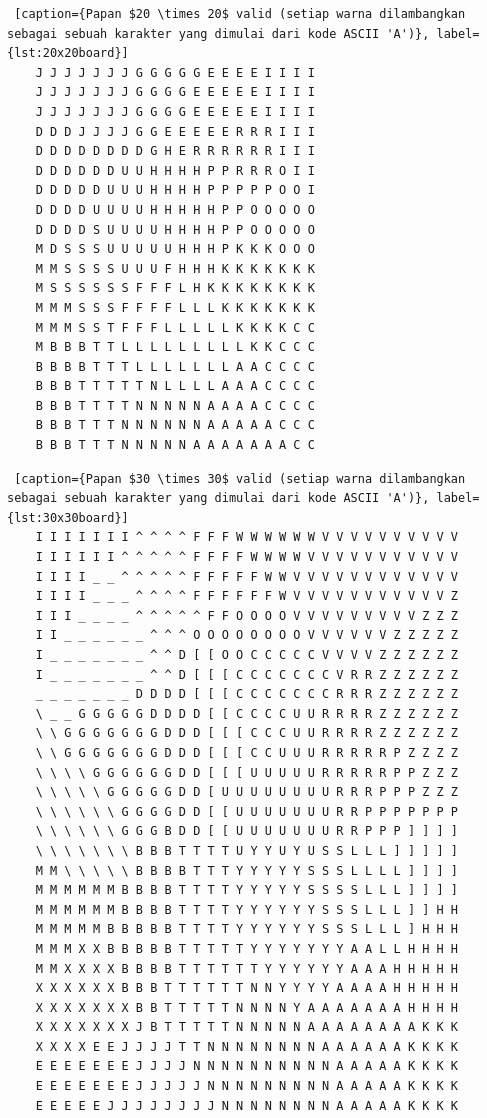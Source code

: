 \documentclass[a4paper,twoside]{article}
\begin{document}
	\begin{lstlisting} [caption={Papan $20 \times 20$ valid (setiap warna dilambangkan sebagai sebuah karakter yang dimulai dari kode ASCII 'A')}, label={lst:20x20board}] 
	J J J J J J J G G G G G E E E E I I I I
	J J J J J J J G G G G E E E E E I I I I
	J J J J J J J G G G G E E E E E I I I I
	D D D J J J J G G E E E E E R R R I I I
	D D D D D D D D G H E R R R R R R I I I
	D D D D D D U U H H H H P P R R R O I I
	D D D D D U U U H H H H P P P P P O O I
	D D D D U U U U H H H H H P P O O O O O
	D D D D S U U U U H H H H P P O O O O O
	M D S S S U U U U U H H H P K K K O O O
	M M S S S S U U U F H H H K K K K K K K
	M S S S S S S F F F L H K K K K K K K K
	M M M S S S F F F F L L L K K K K K K K
	M M M S S T F F F L L L L L K K K K C C
	M B B B T T L L L L L L L L L K K C C C
	B B B B T T T L L L L L L L A A C C C C
	B B B T T T T T N L L L L A A A C C C C
	B B B T T T T N N N N N A A A A C C C C
	B B B T T T N N N N N N A A A A A C C C
	B B B T T T N N N N N A A A A A A A C C
	\end{lstlisting}
	
	\begin{lstlisting} [caption={Papan $30 \times 30$ valid (setiap warna dilambangkan sebagai sebuah karakter yang dimulai dari kode ASCII 'A')}, label={lst:30x30board}]
	I I I I I I I ^ ^ ^ ^ F F F W W W W W W V V V V V V V V V V
	I I I I I I ^ ^ ^ ^ ^ F F F F W W W W V V V V V V V V V V V
	I I I I _ _ ^ ^ ^ ^ ^ F F F F F W W V V V V V V V V V V V V
	I I I I _ _ _ ^ ^ ^ ^ F F F F F F W V V V V V V V V V V V Z
	I I I _ _ _ _ ^ ^ ^ ^ ^ F F O O O O V V V V V V V V V Z Z Z
	I I _ _ _ _ _ _ ^ ^ ^ O O O O O O O O V V V V V V Z Z Z Z Z
	I _ _ _ _ _ _ _ ^ ^ D [ [ O O C C C C C V V V V Z Z Z Z Z Z
	I _ _ _ _ _ _ _ ^ ^ D [ [ [ C C C C C C C V R R Z Z Z Z Z Z
	_ _ _ _ _ _ _ D D D D [ [ [ C C C C C C C R R R Z Z Z Z Z Z
	\ _ _ G G G G G D D D D [ [ C C C C U U R R R R Z Z Z Z Z Z
	\ \ G G G G G G G D D D [ [ [ C C C U U R R R R Z Z Z Z Z Z
	\ \ G G G G G G G D D D [ [ [ C C U U U R R R R R P Z Z Z Z
	\ \ \ \ G G G G G G D D [ [ [ U U U U U R R R R R P P Z Z Z
	\ \ \ \ \ G G G G G D D [ U U U U U U U U R R R P P P Z Z Z
	\ \ \ \ \ \ G G G G D D [ [ U U U U U U U R R P P P P P P P
	\ \ \ \ \ \ G G G B D D [ [ U U U U U U U R R P P P ] ] ] ]
	\ \ \ \ \ \ \ B B B T T T T U Y Y U Y U S S L L L ] ] ] ] ]
	M M \ \ \ \ \ B B B B T T T Y Y Y Y Y S S S L L L L ] ] ] ]
	M M M M M M B B B B T T T T Y Y Y Y Y S S S S L L L ] ] ] ]
	M M M M M M B B B B T T T T Y Y Y Y Y Y S S S L L L ] ] H H
	M M M M M B B B B B T T T T Y Y Y Y Y Y S S S L L L ] H H H
	M M M X X B B B B B T T T T T Y Y Y Y Y Y Y A A L L H H H H
	M M X X X X B B B B T T T T T T Y Y Y Y Y Y A A A H H H H H
	X X X X X X B B B T T T T T T N N Y Y Y Y A A A A H H H H H
	X X X X X X X B B T T T T T N N N N Y A A A A A A A H H H H
	X X X X X X X J B T T T T T N N N N N A A A A A A A A K K K
	X X X X E E J J J J T T N N N N N N N N A A A A A A K K K K
	E E E E E E E J J J J N N N N N N N N N N A A A A A K K K K
	E E E E E E E J J J J J N N N N N N N N N A A A A A K K K K
	E E E E E J J J J J J J J N N N N N N N N A A A A A K K K K
	\end{lstlisting}
	
\end{document}
